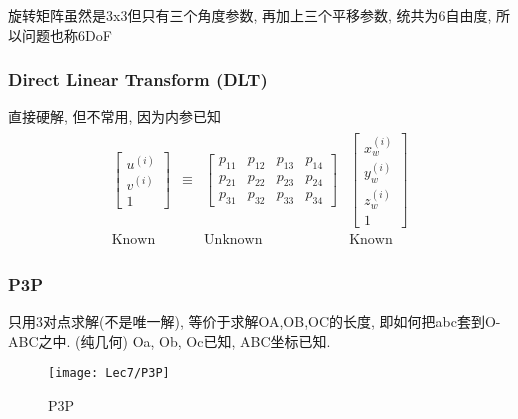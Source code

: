 旋转矩阵虽然是3x3但只有三个角度参数, 再加上三个平移参数, 统共为6自由度, 所以问题也称6DoF

\subsubsection{Direct Linear Transform (DLT)}
直接硬解, 但不常用, 因为内参已知
\begin{align*}
    \begin{array}{cccc}
        \begin{bmatrix}
            u^{(i)}\\v^{(i)}\\1
        \end{bmatrix}&\equiv&\begin{bmatrix}
            p_{11} & p_{12} & p_{13} & p_{14} \\
            p_{21} & p_{22} & p_{23} & p_{24} \\
            p_{31} & p_{32} & p_{33} & p_{34}
        \end{bmatrix}&\begin{bmatrix}
            x_w^{(i)}\\y_w^{(i)}\\z_w^{(i)}\\1
        \end{bmatrix}\\
        \text{Known}& &\text{Unknown}&\text{Known}
    \end{array}
\end{align*}

\subsubsection{P3P}
只用3对点求解(不是唯一解), 等价于求解OA,OB,OC的长度, 即如何把abc套到O-ABC之中. (纯几何) Oa, Ob, Oc已知, ABC坐标已知. 
\begin{figure}[H]
    \centering
    \texttt{[image: Lec7/P3P]}
    \caption{P3P}
\end{figure}

